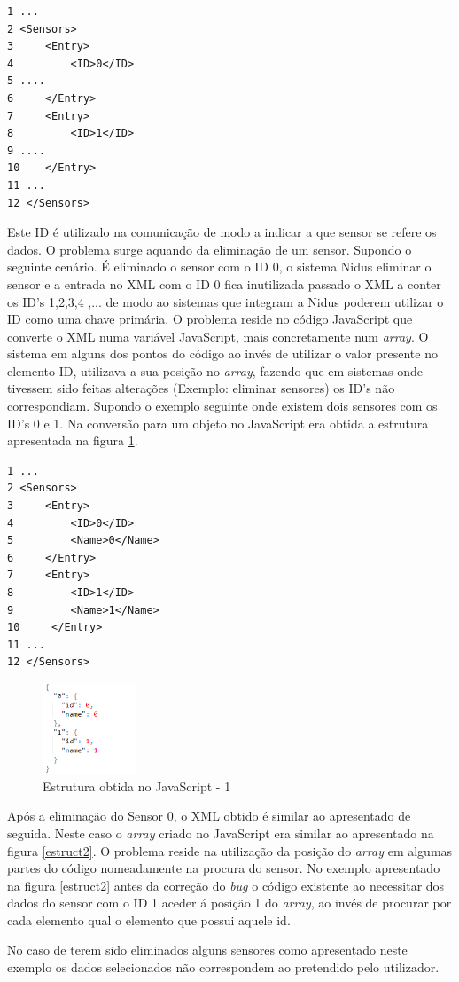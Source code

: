 \begin{verbatim}
1 ...
2 <Sensors>
3     <Entry>
4         <ID>0</ID>
5 ....
6     </Entry>
7     <Entry>
8         <ID>1</ID>
9 ....
10    </Entry>
11 ...
12 </Sensors>

\end{verbatim}



\par Este ID é utilizado na comunicação de modo a indicar a que sensor se refere os dados. O problema surge aquando da eliminação de um sensor. Supondo o seguinte cenário. É eliminado o sensor com o ID 0, o sistema Nidus eliminar o sensor e a entrada no XML com o ID 0 fica inutilizada passado o XML a conter os ID's 1,2,3,4 ,... de modo ao sistemas que integram a Nidus poderem utilizar o ID como uma chave primária. O problema reside no código JavaScript que converte o XML numa variável JavaScript, mais concretamente num \textit{array}. O sistema em alguns dos pontos do código ao invés de utilizar o valor presente no elemento ID, utilizava a sua posição no \textit{array}, fazendo que em sistemas onde tivessem sido feitas alterações (Exemplo: eliminar sensores) os ID's não correspondiam. Supondo o exemplo seguinte onde existem dois sensores com os ID's 0 e 1. Na conversão para um objeto no JavaScript era obtida a estrutura apresentada na figura \ref{estruct1}.

\begin{verbatim}
1 ...
2 <Sensors>
3     <Entry>
4         <ID>0</ID>
5         <Name>0</Name>
6     </Entry>
7     <Entry>
8         <ID>1</ID>
9         <Name>1</Name>
10     </Entry>
11 ...
12 </Sensors>

\end{verbatim}

\begin{figure}[ht]
\centering
\includegraphics[width=0.25\textwidth]{images/estructu1.png}
\caption{Estrutura obtida no JavaScript - 1}\label{estruct1}
\end{figure}

\par Após a eliminação do Sensor 0, o XML obtido é similar ao apresentado de seguida. Neste caso o \textit{array} criado no JavaScript era similar ao apresentado na figura \ref{estruct2}. O problema reside na utilização da posição do \textit{array} em algumas partes do código nomeadamente na procura do sensor. No exemplo apresentado na figura \ref{estruct2} antes da correção do \textit{bug} o código existente ao necessitar dos dados do sensor com o ID 1 aceder á posição 1 do \textit{array}, ao invés de procurar por cada elemento qual o elemento que possui aquele id. 
\par No caso de terem sido eliminados alguns sensores como apresentado neste exemplo os dados selecionados não correspondem ao pretendido pelo utilizador.

